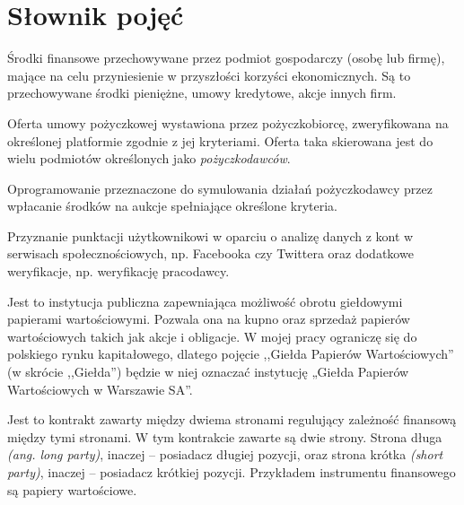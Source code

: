 \documentclass[a4paper,twoside,titlepage,openright]{book}
\begin{document}
\chapter*{Słownik pojęć}
\begin{description}[style=nextline]
	\item[Aktywa finansowe] Środki finansowe przechowywane przez podmiot gospodarczy (osobę lub firmę), mające na celu przyniesienie w przyszłości korzyści ekonomicznych. Są to przechowywane środki pieniężne, umowy kredytowe, akcje innych firm.
	\item[Aukcja pożyczkowa] Oferta umowy pożyczkowej wystawiona przez pożyczkobiorcę, zweryfikowana na określonej platformie zgodnie z jej kryteriami. Oferta taka skierowana jest do wielu podmiotów określonych jako \textit{pożyczkodawców}.
	\item[Automat inwestycyjny] Oprogramowanie przeznaczone do symulowania działań pożyczkodawcy przez wpłacanie środków na aukcje spełniające określone kryteria.
	\item[FriendlyScore] Przyznanie punktacji użytkownikowi w oparciu o analizę danych z kont w serwisach społecznościowych, np. Facebooka czy Twittera oraz dodatkowe weryfikacje, np. weryfikację pracodawcy.
	\item[Giełda Papierów Wartościowych] Jest to instytucja publiczna zapewniająca możliwość obrotu giełdowymi papierami wartościowymi. Pozwala ona na kupno oraz sprzedaż papierów wartościowych takich jak akcje i obligacje. W mojej pracy ograniczę się do polskiego rynku kapitałowego, dlatego pojęcie ,,Giełda Papierów Wartościowych'' (w skrócie ,,Giełda'') będzie w niej oznaczać instytucję „Giełda Papierów Wartościowych w Warszawie SA”.
	\item[Instrument finansowy \textit{(ang. financial instrument)}]  Jest to kontrakt zawarty między dwiema stronami regulujący zależność finansową między tymi stronami. W tym kontrakcie zawarte są dwie strony. Strona długa \textit{(ang. long party)}, inaczej -- posiadacz długiej pozycji, oraz strona krótka \textit{(short party)}, inaczej -- posiadacz krótkiej pozycji. Przykładem instrumentu finansowego są papiery wartościowe. \cite{inwestycje}

\end{description}
\end{document}
